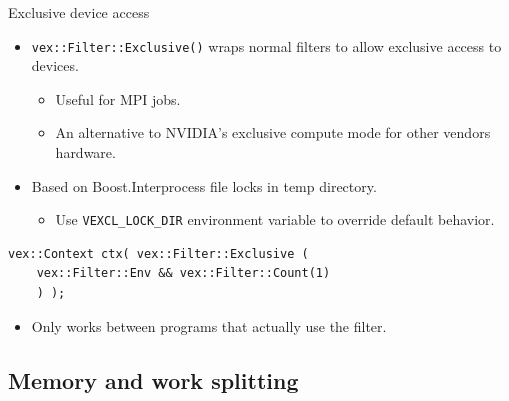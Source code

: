 \documentclass[@BEAMER_OPTIONS@]{beamer}
\newcommand{\code}[1]{\lstinline|#1|}
\begin{document}
\begin{frame}[fragile]{Exclusive device access}
    \begin{itemize}
        \item \code{vex::Filter::Exclusive()} wraps normal filters to allow
            exclusive access to devices.
            \begin{itemize}
                \item Useful for MPI jobs.
                \item An alternative to NVIDIA's exclusive compute mode for
                    other vendors hardware.
            \end{itemize}
        \item Based on Boost.Interprocess file locks in temp directory.
            \begin{itemize}
                \item Use \code{VEXCL_LOCK_DIR} environment variable to
                    override default behavior.
            \end{itemize}
    \end{itemize}
    \begin{exampleblock}{}
        \begin{lstlisting}
vex::Context ctx( vex::Filter::Exclusive (
    vex::Filter::Env && vex::Filter::Count(1)
    ) );
        \end{lstlisting}
    \end{exampleblock}
    \begin{itemize}
        \item \alert{Only works between programs that actually use the filter.}
    \end{itemize}
\end{frame}


\subsection{Memory and work splitting}
\end{document}
